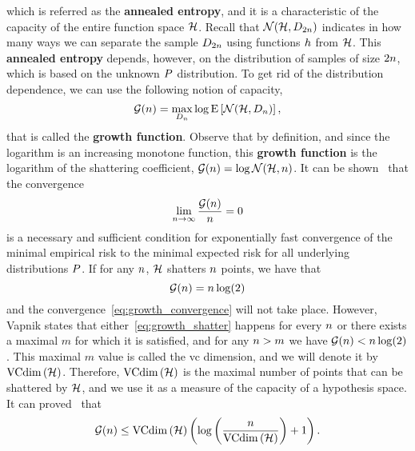 which is referred as the \textbf{annealed entropy}, and it is a characteristic of the capacity of the entire function space $\mathcal{H}$. Recall that $\mathcal{N}(\mathcal{H}, D_{2 n})$ indicates in how many ways we can separate the sample $D_{2 n}$ using functions $h$ from $\mathcal{H}$.
%
This \textbf{annealed entropy} depends, however, on the distribution of samples of size $2 n$, which is based on the unknown $P$ distribution. To get rid of the distribution dependence, we can use the following notion of capacity,
\begin{equation}
    \nonumber
    \mathcal{G}(n) = \max_{D_n} \log \operatorname{E}\left[\mathcal{N}(\mathcal{H}, D_{n})\right] , 
\end{equation}
that is called the \textbf{growth function}. Observe that by definition, and since the logarithm is an increasing monotone function, this \textbf{growth function} is the logarithm of the shattering coefficient, $\mathcal{G}(n) = \log \mathcal{N}(\mathcal{H}, n)$.
%
It can be shown~\citep{Vapnik00} that the convergence 
\begin{equation}
    \label{eq:growth_convergence}
    \lim_{\nsamples \to \infty} \frac{\mathcal{G}(\nsamples)}{\nsamples} = 0
\end{equation} 
is a necessary and sufficient condition for exponentially fast convergence of the minimal empirical risk to the minimal expected risk for all underlying distributions $P$.
%
If for any $n$,  $\mathcal{H}$ shatters $n$ points, we have that 
\begin{equation}
    \label{eq:growth_shatter}
    \mathcal{G}(\nsamples) = \nsamples \log(2)
\end{equation}
and the convergence~\eqref{eq:growth_convergence} will not take place.
However, Vapnik states that either~\eqref{eq:growth_shatter} happens for every $n$ or there exists a maximal $m$ for which it is satisfied, and for any $n > m$ we have $\mathcal{G}(n) < n \log(2)$. This maximal $m$ value is called the \acrfull{vc} dimension, and we will denote it by $\operatorname{VCdim}\left(\mathcal{H}\right)$. Therefore, $\operatorname{VCdim}\left(\mathcal{H}\right)$ is the maximal number of points that can be shattered by $\mathcal{H}$, and we use it as a measure of the capacity of a hypothesis space. It can proved~\citep{Vapnik00} that 
\begin{equation}
    \label{eq:vcdim_ineq}
    \mathcal{G}(\nsamples) \leq \vcdim{\hypspace} \left(\log\left(\frac{\nsamples}{\vcdim{\hypspace}}\right) + 1 \right) .
\end{equation}
